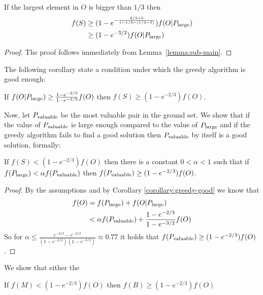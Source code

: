 \begin{lemma}
	\label{eq:sub:greedy}
	If the largest element in $O$ is bigger than $1/3$ then
	\begin{align*}
		f(S) & \geq (1-e^{-\frac{2/3 + \delta}{1 - 1/3 - (1/3 - \delta)}})f(O|P_{\text{large}})
		\\		& \geq (1 - e^{-3/2})f(O|P_{\text{large}})
	\end{align*}
\end{lemma}

\begin{proof}
	The proof follows immediately from Lemma~\ref{lemma:sub-main}.
\end{proof}

The following corollary state a condition under which the greedy algorithm is good enough:
\begin{corollary}
	\label{corollary:greedy-good}
	If $f(O|P_{\text{large}}) \geq \frac{1-e^{-2/3}}{1-e^{-3/2}}f(O)$ then $f(S) \geq (1 - e^{-2/3})f(O)$.
\end{corollary}

Now, let $P_{\text{valuable}}$ be the most valuable pair in the ground set.
We show that if the value of $P_{\text{valuable}}$ is large enough compared to the value of $P_{\text{large}}$ and if the greedy algorithm fails to find a good solution then $P_{\text{valuable}}$ by itself is a good solution, formally:

\begin{lemma}
	\label{lemma:sub:alpha}
	If $f(S) < (1 - e^{-2/3})f(O)$ then there is a constant $0 < \alpha < 1$ such that if $f(P_{\text{large}}) < \alpha f(P_{\text{valuable}})$ then $f(P_{\text{valuable}}) \geq (1 - e^{-2/3})f(O)$.
\end{lemma}

\begin{proof}
	By the assumptions and by Corollary \ref{corollary:greedy-good} we know that 
	\begin{align}
		f(O)	& = f(P_{\text{large}}) + f(O|P_{\text{large}}) 
		\\ 		& < \alpha f(P_{\text{valuable}}) + \frac{1-e^{-2/3}}{1-e^{-3/2}}f(O)
	\end{align}
	So for $\alpha \leq \frac{e^{-2/3} - e^{-3/2}}{(1-e^{-2/3})(1-e^{-3/2})} \approx 0.77$ it holds that $f(P_{\text{valuable}}) \geq (1 - e^{-2/3})f(O)$.
\end{proof}

We show that either the 
\begin{lemma}
	\label{lemma:mmgreedy-or-bucket}
	If $f(M) < (1 - e^{-2/3})f(O)$ then $f(B) \geq (1 - e^{-2/3})f(O)$
\end{lemma}

